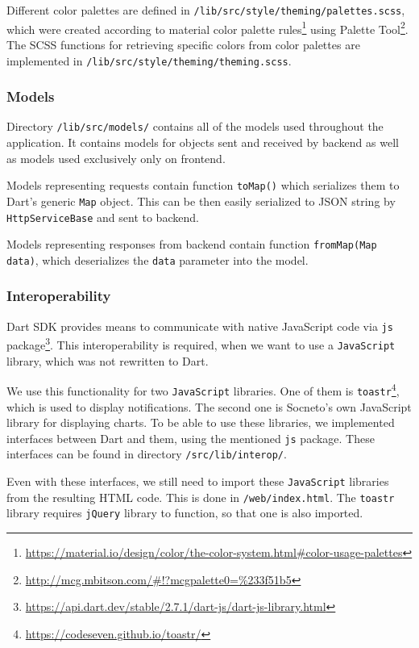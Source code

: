 Different color palettes are defined in \newline\texttt{/lib/src/style/theming/palettes.scss}, which were created according to material color palette rules\footnote{\url{https://material.io/design/color/the-color-system.html\#color-usage-palettes}} using Palette Tool\footnote{\url{http://mcg.mbitson.com/\#!?mcgpalette0=\%233f51b5}}. The SCSS functions for retrieving specific colors from color palettes are implemented in \newline\texttt{/lib/src/style/theming/theming.scss}.

\subsubsection{Models}
Directory \texttt{/lib/src/models/} contains all of the models used throughout the application. It contains models for objects sent and received by backend as well as models used exclusively only on frontend. 

Models representing requests contain function \texttt{toMap()} which serializes them to Dart's generic \texttt{Map} object. This can be then easily serialized to JSON string by \texttt{HttpServiceBase} and sent to backend. 

Models representing responses from backend contain function \texttt{fromMap(Map data)}, which deserializes the \texttt{data} parameter into the model.

\subsubsection{Interoperability} \label{section:frontend-code-interoperability}
Dart SDK provides means to communicate with native JavaScript code via \texttt{js} package\footnote{\url{https://api.dart.dev/stable/2.7.1/dart-js/dart-js-library.html}}. This interoperability is required, when we want to use a \texttt{JavaScript} library, which was not rewritten to Dart. 

We use this functionality for two \texttt{JavaScript} libraries. One of them is \texttt{toastr}\footnote{\url{https://codeseven.github.io/toastr/}}, which is used to display notifications. The second one is Socneto's own JavaScript library for displaying charts. To be able to use these libraries, we implemented interfaces between Dart and them, using the mentioned \texttt{js} package. These interfaces can be found in directory \texttt{/src/lib/interop/}.

Even with these interfaces, we still need to import these \texttt{JavaScript} libraries from the resulting HTML code. This is done in \texttt{/web/index.html}. The \texttt{toastr} library requires \texttt{jQuery} library to function, so that one is also imported.

